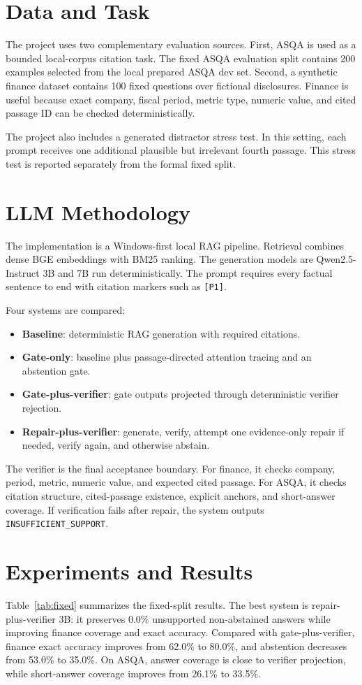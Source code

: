 \documentclass[conference]{IEEEtran}
\begin{document}
\section{Data and Task}
The project uses two complementary evaluation sources. First, ASQA is used as a bounded local-corpus citation task. The fixed ASQA evaluation split contains 200 examples selected from the local prepared ASQA dev set. Second, a synthetic finance dataset contains 100 fixed questions over fictional disclosures. Finance is useful because exact company, fiscal period, metric type, numeric value, and cited passage ID can be checked deterministically.

The project also includes a generated distractor stress test. In this setting, each prompt receives one additional plausible but irrelevant fourth passage. This stress test is reported separately from the formal fixed split.

\section{LLM Methodology}
The implementation is a Windows-first local RAG pipeline. Retrieval combines dense BGE embeddings with BM25 ranking. The generation models are Qwen2.5-Instruct 3B and 7B run deterministically. The prompt requires every factual sentence to end with citation markers such as \texttt{[P1]}.

Four systems are compared:
\begin{itemize}
\item \textbf{Baseline}: deterministic RAG generation with required citations.
\item \textbf{Gate-only}: baseline plus passage-directed attention tracing and an abstention gate.
\item \textbf{Gate-plus-verifier}: gate outputs projected through deterministic verifier rejection.
\item \textbf{Repair-plus-verifier}: generate, verify, attempt one evidence-only repair if needed, verify again, and otherwise abstain.
\end{itemize}

The verifier is the final acceptance boundary. For finance, it checks company, period, metric, numeric value, and expected cited passage. For ASQA, it checks citation structure, cited-passage existence, explicit anchors, and short-answer coverage. If verification fails after repair, the system outputs \texttt{INSUFFICIENT\_SUPPORT}.

\section{Experiments and Results}
Table~\ref{tab:fixed} summarizes the fixed-split results. The best system is repair-plus-verifier 3B: it preserves 0.0\% unsupported non-abstained answers while improving finance coverage and exact accuracy. Compared with gate-plus-verifier, finance exact accuracy improves from 62.0\% to 80.0\%, and abstention decreases from 53.0\% to 35.0\%. On ASQA, answer coverage is close to verifier projection, while short-answer coverage improves from 26.1\% to 33.5\%.
\end{document}

